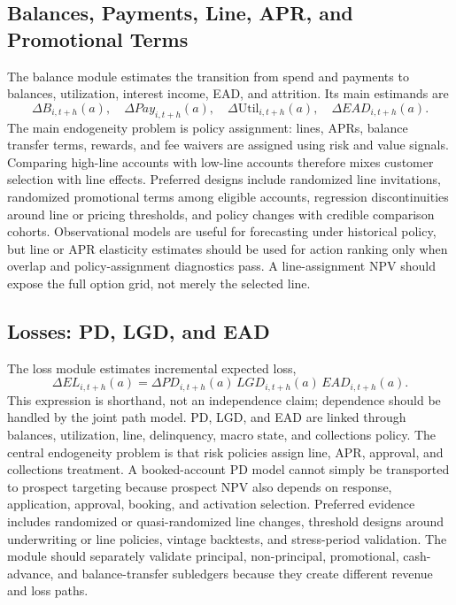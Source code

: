 \documentclass[11pt]{article}
\newcommand{\1}{\mathbf{1}}
\begin{document}
\subsection*{Balances, Payments, Line, APR, and Promotional Terms}

The balance module estimates the transition from spend and payments to
balances, utilization, interest income, EAD, and attrition. Its main estimands
are
\[
  \Delta B_{i,t+h}(a),\quad
  \Delta Pay_{i,t+h}(a),\quad
  \Delta \mathrm{Util}_{i,t+h}(a),\quad
  \Delta EAD_{i,t+h}(a).
\]
The main endogeneity problem is policy assignment: lines, APRs, balance
transfer terms, rewards, and fee waivers are assigned using risk and value
signals. Comparing high-line accounts with low-line accounts therefore mixes
customer selection with line effects. Preferred designs include randomized
line invitations, randomized promotional terms among eligible accounts,
regression discontinuities around line or pricing thresholds, and policy
changes with credible comparison cohorts. Observational models are useful for
forecasting under historical policy, but line or APR elasticity estimates
should be used for action ranking only when overlap and policy-assignment
diagnostics pass. A line-assignment NPV should expose the full option grid,
not merely the selected line.

\subsection*{Losses: PD, LGD, and EAD}

The loss module estimates incremental expected loss,
\[
  \Delta EL_{i,t+h}(a)
  =
  \Delta PD_{i,t+h}(a)\,LGD_{i,t+h}(a)\,EAD_{i,t+h}(a).
\]
This expression is shorthand, not an independence claim; dependence should be
handled by the joint path model. PD, LGD, and EAD are linked through balances,
utilization, line, delinquency, macro state, and collections policy. The
central endogeneity problem is that risk policies assign line, APR, approval,
and collections treatment. A booked-account PD model cannot simply be
transported to prospect targeting because prospect NPV also depends on
response, application, approval, booking, and activation selection. Preferred
evidence includes randomized or quasi-randomized line changes, threshold
designs around underwriting or line policies, vintage backtests, and
stress-period validation. The module should separately validate principal,
non-principal, promotional, cash-advance, and balance-transfer subledgers
because they create different revenue and loss paths.
\end{document}
